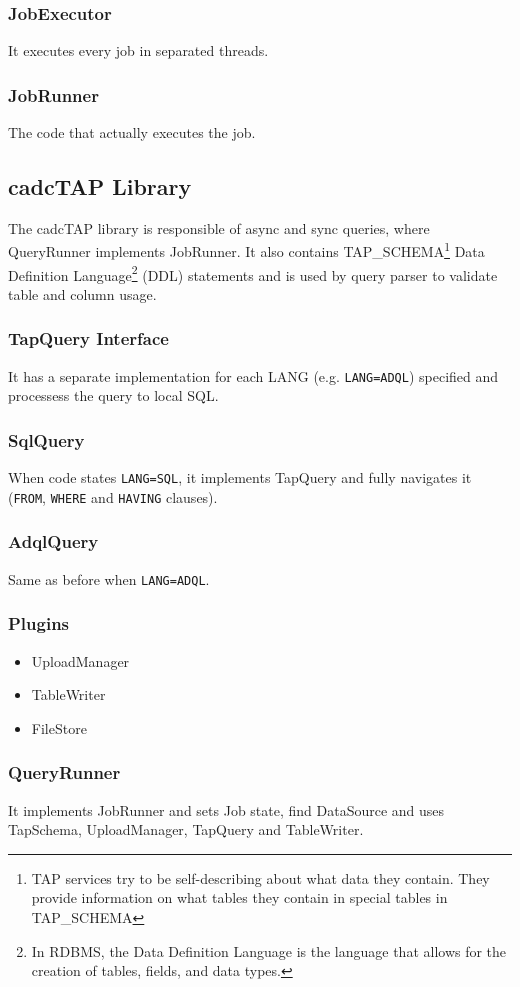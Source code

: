 \subsubsection{JobExecutor}

It executes every job in separated threads.

\subsubsection{JobRunner}

The code that actually executes the job.


\subsection{cadcTAP Library}

The cadcTAP library is responsible of async and sync queries, where QueryRunner implements JobRunner. It also contains TAP\_SCHEMA\footnote{TAP services try to be self-describing about what data they contain. They provide information on what tables they contain in special tables in TAP\_SCHEMA}
Data Definition Language\footnote{In RDBMS, the Data Definition Language is the language that allows for the creation of tables, fields, and data types.} (DDL) %
statements and is used by query parser to validate table and column usage.

\subsubsection{TapQuery Interface}

It has a separate implementation for each LANG (e.g. \texttt{LANG=ADQL}) specified and processess the query to local SQL.

\subsubsection{SqlQuery}

When code states \texttt{LANG=SQL}, it implements TapQuery and fully navigates it (\texttt{FROM}, \texttt{WHERE} and \texttt{HAVING} clauses).

\subsubsection{AdqlQuery}

Same as before when \texttt{LANG=ADQL}.

\subsubsection{Plugins}

\begin{itemize}
\item UploadManager
\item TableWriter
\item FileStore
\end{itemize}


\subsubsection{QueryRunner}

It implements JobRunner and sets Job state, find DataSource and uses TapSchema, UploadManager, TapQuery and TableWriter.

